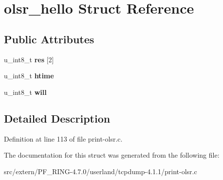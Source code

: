 \hypertarget{structolsr__hello}{
\section{olsr\_\-hello Struct Reference}
\label{structolsr__hello}
}
\subsection*{Public Attributes}
\begin{DoxyCompactItemize}
\item 
\hypertarget{structolsr__hello_a71d49e78841180156a80264e190331c4}{
u\_\-int8\_\-t {\bfseries res} \mbox{[}2\mbox{]}}
\label{structolsr__hello_a71d49e78841180156a80264e190331c4}

\item 
\hypertarget{structolsr__hello_ab30c7e82e83e0e7226e0632d8d713ba6}{
u\_\-int8\_\-t {\bfseries htime}}
\label{structolsr__hello_ab30c7e82e83e0e7226e0632d8d713ba6}

\item 
\hypertarget{structolsr__hello_a15a3169b166e675c2a280249a8435cd5}{
u\_\-int8\_\-t {\bfseries will}}
\label{structolsr__hello_a15a3169b166e675c2a280249a8435cd5}

\end{DoxyCompactItemize}


\subsection{Detailed Description}


Definition at line 113 of file print-\/olsr.c.



The documentation for this struct was generated from the following file:\begin{DoxyCompactItemize}
\item 
src/extern/PF\_\-RING-\/4.7.0/userland/tcpdump-\/4.1.1/print-\/olsr.c\end{DoxyCompactItemize}
